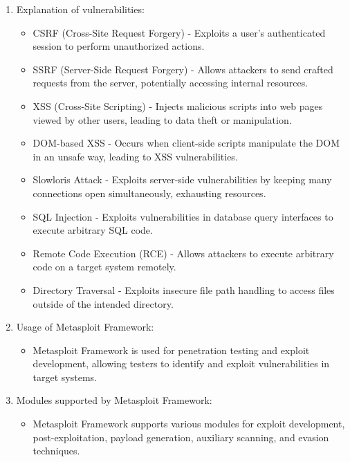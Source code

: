 \documentclass[11pt]{article}
\begin{document}
\begin{enumerate}
    \item Explanation of vulnerabilities:
          \begin{itemize}
              \item CSRF (Cross-Site Request Forgery) - Exploits a user's authenticated session to perform unauthorized actions.
              \item SSRF (Server-Side Request Forgery) - Allows attackers to send crafted requests from the server, potentially accessing internal resources.
              \item XSS (Cross-Site Scripting) - Injects malicious scripts into web pages viewed by other users, leading to data theft or manipulation.
              \item DOM-based XSS - Occurs when client-side scripts manipulate the DOM in an unsafe way, leading to XSS vulnerabilities.
              \item Slowloris Attack - Exploits server-side vulnerabilities by keeping many connections open simultaneously, exhausting resources.
              \item SQL Injection - Exploits vulnerabilities in database query interfaces to execute arbitrary SQL code.
              \item Remote Code Execution (RCE) - Allows attackers to execute arbitrary code on a target system remotely.
              \item Directory Traversal - Exploits insecure file path handling to access files outside of the intended directory.
          \end{itemize}

    \item Usage of Metasploit Framework:
          \begin{itemize}
              \item Metasploit Framework is used for penetration testing and exploit development, allowing testers to identify and exploit vulnerabilities in target systems.
          \end{itemize}

    \item Modules supported by Metasploit Framework:
          \begin{itemize}
              \item Metasploit Framework supports various modules for exploit development, post-exploitation, payload generation, auxiliary scanning, and evasion techniques.
          \end{itemize}
\end{enumerate}
\end{document}

